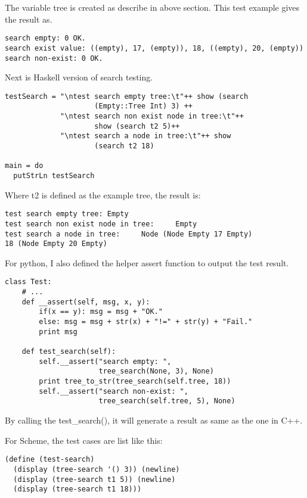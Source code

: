 \documentclass{article}
\begin{document}
The variable tree is created as describe in above section. This test example 
gives the result as.
\begin{verbatim}
search empty: 0 OK.
search exist value: ((empty), 17, (empty)), 18, ((empty), 20, (empty))
search non-exist: 0 OK.
\end{verbatim}

Next is Haskell version of search testing.

\lstset{language=Haskell}
\begin{lstlisting}
testSearch = "\ntest search empty tree:\t"++ show (search 
                     (Empty::Tree Int) 3) ++
             "\ntest search non exist node in tree:\t"++ 
                     show (search t2 5)++
             "\ntest search a node in tree:\t"++ show 
                     (search t2 18)

main = do
  putStrLn testSearch
\end{lstlisting}

Where t2 is defined as the example tree, the result is:
\begin{verbatim}
test search empty tree: Empty
test search non exist node in tree:     Empty
test search a node in tree:     Node (Node Empty 17 Empty) 
18 (Node Empty 20 Empty)
\end{verbatim}

For python, I also defined the helper assert function to output the test
result.

\lstset{language=Python}
\begin{lstlisting}
class Test:
    # ...
    def __assert(self, msg, x, y):
        if(x == y): msg = msg + "OK."
        else: msg = msg + str(x) + "!=" + str(y) + "Fail."
        print msg

    def test_search(self):
        self.__assert("search empty: ", 
                      tree_search(None, 3), None)
        print tree_to_str(tree_search(self.tree, 18))
        self.__assert("search non-exist: ", 
                      tree_search(self.tree, 5), None)
\end{lstlisting}

By calling the test\_search(), it will generate a result as same as the one
in C++.

For Scheme, the test cases are list like this:

\lstset{language=lisp}
\begin{lstlisting}
(define (test-search)
  (display (tree-search '() 3)) (newline)
  (display (tree-search t1 5)) (newline)
  (display (tree-search t1 18)))
\end{lstlisting}
\end{document}
